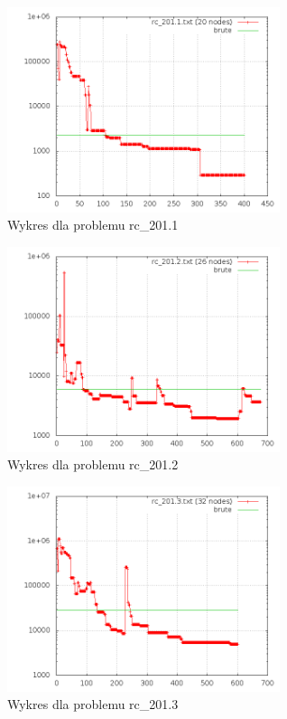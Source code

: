 \begin{frame}{}
    \begin{figure}
        \centering
        \includegraphics[width=8cm]{charts/rc_201_1.png}
        \caption{Wykres dla problemu rc\_201.1}
    \end{figure}
\end{frame}

\begin{frame}{}
    \begin{figure}
        \centering
        \includegraphics[width=8cm]{charts/rc_201_2.png}
        \caption{Wykres dla problemu rc\_201.2}
    \end{figure}
\end{frame}

\begin{frame}{}
    \begin{figure}
        \centering
        \includegraphics[width=8cm]{charts/rc_201_3.png}
        \caption{Wykres dla problemu rc\_201.3}
    \end{figure}
\end{frame}

